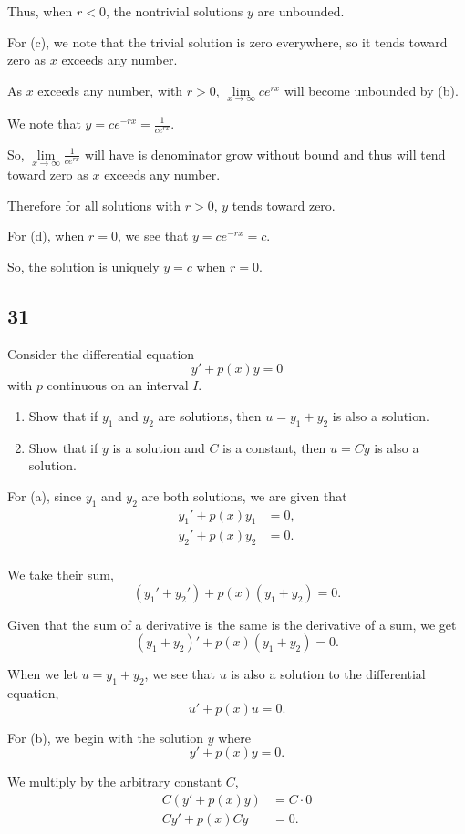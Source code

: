 \documentclass[../hw11]{subfiles}
\begin{document}
Thus, when $r<0$, the nontrivial solutions $y$ are unbounded.

For (c), we note that the trivial solution is zero everywhere, so it tends toward zero as $x$ exceeds any number.

As $x$ exceeds any number, with $r>0$, $\lim\limits_{x\to\infty} ce^{rx}$ will become unbounded by (b).

We note that $y=ce^{-rx}=\frac{1}{ce^{rx}}$.

So, $\lim\limits_{x\to\infty} \frac{1}{ce^{rx}}$ will have is denominator grow without bound and thus will tend toward zero as $x$ exceeds any number.

Therefore for all solutions with $r>0$, $y$ tends toward zero.

For (d), when $r=0$, we see that $y=ce^{-rx}=c$.

So, the solution is uniquely $y=c$ when $r=0$.


\subsection*{31}
Consider the differential equation \[y'+p(x)y=0\] with $p$ continuous on an interval $I$.
\begin{enumerate}[label= (\alph*)]
    \item Show that if $y_1$ and $y_2$ are solutions, then $u=y_1+y_2$ is also a solution.
    \item Show that if $y$ is a solution and $C$ is a constant, then $u=Cy$ is also a solution.
\end{enumerate}

For (a), since $y_1$ and $y_2$ are both solutions, we are given that
\begin{align*}
    {y_1}'+p(x)y_1&=0,\\
    {y_2}'+p(x)y_2&=0.\\
\end{align*}

We take their sum,
\[({y_1}'+{y_2}')+p(x)(y_1+y_2)=0.\]

Given that the sum of a derivative is the same is the derivative of a sum, we get
\[{(y_1+y_2)}'+p(x)(y_1+y_2)=0.\]

When we let $u=y_1+y_2$, we see that $u$ is also a solution to the differential equation,
\[u'+p(x)u=0.\]

For (b), we begin with the solution $y$ where
\[y'+p(x)y=0.\]

We multiply by the arbitrary constant $C$, 
\begin{align*}
    C(y'+p(x)y)&=C\cdot0\\
    Cy'+p(x)Cy&=0.\\
\end{align*}
\end{document}
